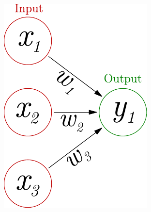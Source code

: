 \documentclass{beamer}
\newcommand{\figheight}{0.72\textheight}
\begin{document}
\begin{frame}
\begin{columns}[T]
\begin{column}{.45\textwidth}
    \end{column}
    \begin{column}{.55\textwidth}
 \begin{figure}[t]
\centering
 \includegraphics[height = \figheight]{./fig/perceptron_maths.pdf}
\end{figure}
    \end{column}
  \end{columns}
\end{frame}
\end{document}
